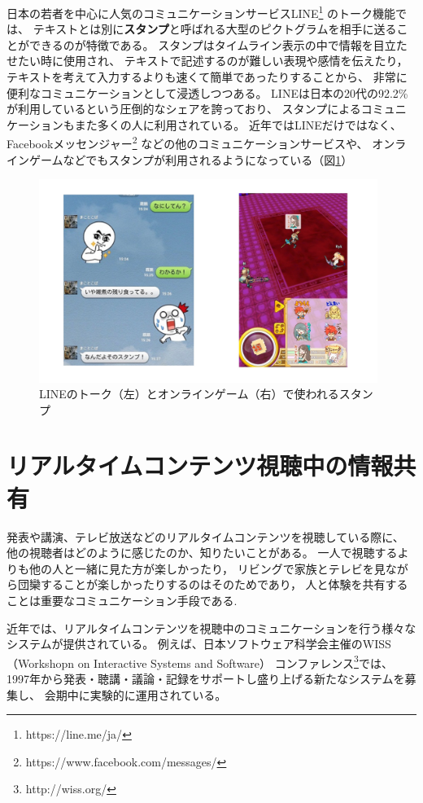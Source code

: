 日本の若者を中心に人気のコミュニケーションサービスLINE\footnote{\textsf{https://line.me/ja/}}
のトーク機能では、
テキストとは別に{\bf スタンプ}と呼ばれる大型のピクトグラムを相手に送ることができるのが特徴である。
スタンプはタイムライン表示の中で情報を目立たせたい時に使用され、
テキストで記述するのが難しい表現や感情を伝えたり，
テキストを考えて入力するよりも速くて簡単であったりすることから、
非常に便利なコミュニケーションとして浸透しつつある。
LINEは日本の20代の92.2\%が利用しているという圧倒的なシェアを誇っており、
スタンプによるコミュニケーションもまた多くの人に利用されている。
近年ではLINEだけではなく、Facebookメッセンジャー\footnote{\textsf{https://www.facebook.com/messages/}}
などの他のコミュニケーションサービスや、
オンラインゲームなどでもスタンプが利用されるようになっている（図\ref{gamestamp}）

\begin{figure}[H]
\centering
\includegraphics[width=11cm]{images/gamestamp.png}
\caption{LINEのトーク（左）とオンラインゲーム（右）で使われるスタンプ}
\label{gamestamp}
\end{figure}


\section{リアルタイムコンテンツ視聴中の情報共有}

発表や講演、テレビ放送などのリアルタイムコンテンツを視聴している際に、
他の視聴者はどのように感じたのか、知りたいことがある。
一人で視聴するよりも他の人と一緒に見た方が楽しかったり，
リビングで家族とテレビを見ながら団欒することが楽しかったりするのはそのためであり，
人と体験を共有することは重要なコミュニケーション手段である.

近年では、リアルタイムコンテンツを視聴中のコミュニケーションを行う様々なシステムが提供されている。
例えば、日本ソフトウェア科学会主催のWISS（Workshopn on Interactive Systems and Software）
コンファレンス\footnote{\textsf{http://wiss.org/}}では、
1997年から発表・聴講・議論・記録をサポートし盛り上げる新たなシステムを募集し、
会期中に実験的に運用されている\cite{wiss_challenge}。

